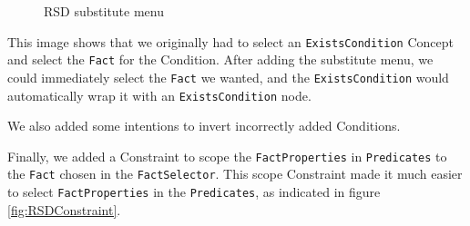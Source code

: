 \begin{figure}
    \centering
    \caption{RSD substitute menu}
    \label{fig:RSDSubstituteMenu}
\end{figure}

This image shows that we originally had to select an \texttt{ExistsCondition} Concept and select the \texttt{Fact} for the Condition.
After adding the substitute menu, we could immediately select the \texttt{Fact} we wanted, and the \texttt{ExistsCondition} would automatically wrap it with an \texttt{ExistsCondition} node.

We also added some intentions to invert incorrectly added Conditions.

Finally, we added a Constraint to scope the \texttt{FactProperties} in \texttt{Predicates} to the \texttt{Fact} chosen in the \texttt{FactSelector}.
This scope Constraint made it much easier to select \texttt{FactProperties} in the \texttt{Predicates}, as indicated in figure \ref{fig:RSDConstraint}.

